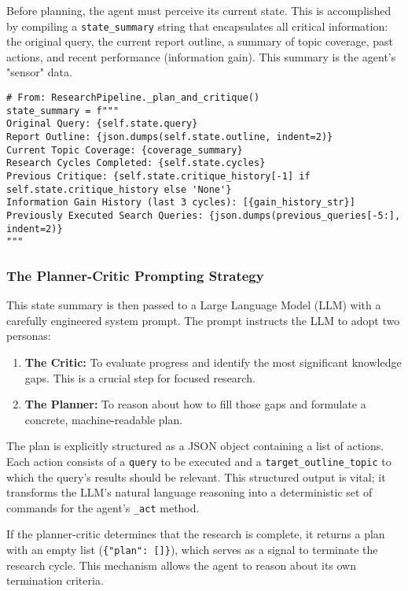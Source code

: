 \documentclass[12pt, a4paper]{article}
\begin{document}
Before planning, the agent must perceive its current state. This is accomplished by compiling a \verb|state_summary| string that encapsulates all critical information: the original query, the current report outline, a summary of topic coverage, past actions, and recent performance (information gain). This summary is the agent's "sensor" data.

\begin{lstlisting}[style=myPython]
# From: ResearchPipeline._plan_and_critique()
state_summary = f"""
Original Query: {self.state.query}
Report Outline: {json.dumps(self.state.outline, indent=2)}
Current Topic Coverage: {coverage_summary}
Research Cycles Completed: {self.state.cycles}
Previous Critique: {self.state.critique_history[-1] if self.state.critique_history else 'None'}
Information Gain History (last 3 cycles): [{gain_history_str}]
Previously Executed Search Queries: {json.dumps(previous_queries[-5:], indent=2)}
"""
\end{lstlisting}

\subsubsection{The Planner-Critic Prompting Strategy}

This state summary is then passed to a Large Language Model (LLM) with a carefully engineered system prompt. The prompt instructs the LLM to adopt two personas:
\begin{enumerate}
    \item \textbf{The Critic:} To evaluate progress and identify the most significant knowledge gaps. This is a crucial step for focused research.
    \item \textbf{The Planner:} To reason about how to fill those gaps and formulate a concrete, machine-readable plan.
\end{enumerate}

The plan is explicitly structured as a JSON object containing a list of actions. Each action consists of a \verb|query| to be executed and a \verb|target_outline_topic| to which the query's results should be relevant. This structured output is vital; it transforms the LLM's natural language reasoning into a deterministic set of commands for the agent's \verb|_act| method.

If the planner-critic determines that the research is complete, it returns a plan with an empty list (\verb|{"plan": []}|), which serves as a signal to terminate the research cycle. This mechanism allows the agent to reason about its own termination criteria.
\end{document}
